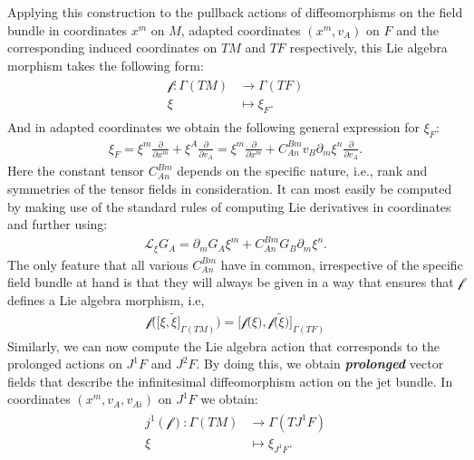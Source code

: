 \documentclass[a4paper,12pt, DIV=14, BCOR=5mm, twoside, headsepline, numbers=noenddot]{scrbook}
\begin{document}
Applying this construction to the pullback actions of diffeomorphisms on the field bundle in coordinates $x^m$ on $M$, adapted coordinates $(x^m, v_A)$ on $F$ and the corresponding induced coordinates on $TM$ and $TF$ respectively, this Lie algebra morphism takes the following form:
\begin{align}\label{LieF}
\begin{aligned}
    \mathcal{f} : \Gamma(TM) &\longrightarrow \Gamma(TF)\\
    \xi &\longmapsto \xi_F .
\end{aligned}
\end{align}
And in adapted coordinates we obtain the following general expression for $\xi_F$:
\begin{align}
   \xi_F = \xi^m \frac{\partial}{\partial x^m} + \xi^A \frac{\partial}{\partial v_A} = \xi^m \frac{\partial}{\partial x^m} + C_{An}^{Bm} v_B \partial_m \xi ^n \frac{\partial}{\partial v_A}. 
\end{align}
Here the constant tensor $C_{An}^{Bm}$ depends on the specific nature, i.e., rank and symmetries of the tensor fields in consideration.
It can most easily be computed by making use of the standard rules of computing Lie derivatives in coordinates and further using:
\begin{align}
    \mathcal{L}_{\xi} G_A = \partial_m G_A \xi^m + C_{An}^{Bm} G_B \partial_m \xi ^n.
\end{align}
The only feature that all various $C_{An}^{Bm}$ have in common, irrespective of the specific field bundle at hand is that they will always be given in a way that ensures that $\mathcal{f}$ defines a Lie algebra morphism, i.e, 
\begin{align}
\mathcal{f}\bigl ( \bigl [\xi, \tilde{\xi} \bigr ]_{\Gamma(TM)}\bigr ) = \bigl [ \mathcal{f}\bigl (\xi\bigr ), \mathcal{f}\bigl (\tilde{\xi}\bigr ) \bigr]_{\Gamma(TF)}
\end{align}
Similarly, we can now compute the Lie algebra action that corresponds to the prolonged actions on $J^1F$ and $J^2F$. By doing this, we obtain \textbf{\textit{prolonged}} vector fields that describe the infinitesimal diffeomorphism action on the jet bundle. In coordinates $(x^m,v_A,v_{Ai})$ on $J^1F$ we obtain:
\begin{align}
    \begin{aligned}
    j^1(\mathcal{f}) : \Gamma(TM) &\longrightarrow \Gamma(TJ^1F)\\
    \xi & \longmapsto \xi_{J^1F}.
    \end{aligned}
\end{align}
\end{document}
